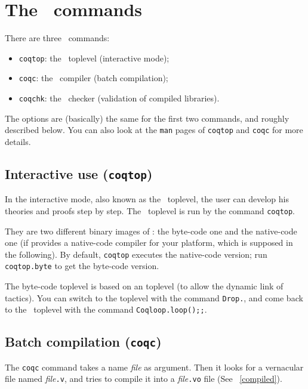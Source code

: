\chapter[The \Coq~commands]{The \Coq~commands\label{Addoc-coqc}
}

There are three \Coq~commands: 
\begin{itemize}
\item {\tt coqtop}: the \Coq\ toplevel (interactive mode);
\item {\tt coqc}: the \Coq\ compiler (batch compilation);
\item {\tt coqchk}: the \Coq\ checker (validation of compiled libraries).
\end{itemize}
The options are (basically) the same for the first two commands, and
roughly described below. You can also look at the \verb!man! pages of
\verb!coqtop! and \verb!coqc! for more details.


\section{Interactive use ({\tt coqtop})}

In the interactive mode, also known as the \Coq~toplevel, the user can
develop his theories and proofs step by step.  The \Coq~toplevel is
run by the command {\tt coqtop}. 

\label{binary-images}
They are two different binary images of \Coq: the byte-code one and
the native-code one (if {\ocaml} provides a native-code compiler
for your platform, which is supposed in the following). By default,
\verb!coqtop! executes the native-code version; run \verb!coqtop.byte! to
get the byte-code version.

The byte-code toplevel is based on an {\ocaml}
toplevel (to allow the dynamic link of tactics).  You can switch to
the {\ocaml} toplevel with the command \verb!Drop.!, and come back to the
\Coq~toplevel with the command \verb!Coqloop.loop();;!.

\section{Batch compilation ({\tt coqc})}
The {\tt coqc} command takes a name {\em file} as argument.  Then it
looks for a vernacular file named {\em file}{\tt .v}, and tries to
compile it into a {\em file}{\tt .vo} file (See ~\ref{compiled}).

